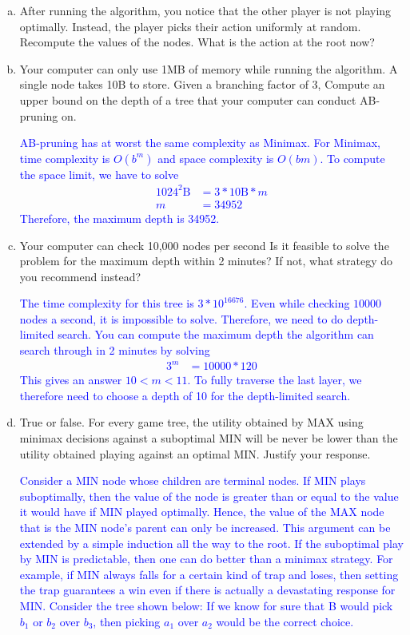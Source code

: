 \documentclass[a4paper]{article}
\begin{document}
\begin{enumerate}[(a)]
\item After running the algorithm, you notice that the other player is not playing optimally. Instead, the player picks their action uniformly at random. Recompute the values of the nodes. What is the action at the root now? 

\item Your computer can only use 1MB of memory while running the algorithm. A single node takes 10B to store. Given a branching factor of 3, Compute an upper bound on the depth of a tree that your computer can conduct AB-pruning on.

\textcolor{blue}{AB-pruning has at worst the same complexity as Minimax. For Minimax, time complexity is $O(b^m)$ and space complexity is $O(bm)$. To compute the space limit, we have to solve 
\begin{align*}
1024^2\text{B} &=3*10\text{B}*m \\
m &= 34952
\end{align*}
Therefore, the maximum depth is 34952. 
}

\item Your computer can check 10,000 nodes per second Is it feasible to solve the problem for the maximum depth within 2 minutes? If not, what strategy do you recommend instead?

\textcolor{blue}{The time complexity for this tree is $3 * 10^{16676}$. Even while checking $10000$ nodes a second, it is impossible to solve. Therefore, we need to do depth-limited search. You can compute the maximum depth the algorithm can search through in 2 minutes by solving
\begin{align*}
3^m &= 10000 * 120
\end{align*}
This gives an answer $10 < m < 11$. To fully traverse the last layer, we therefore need to choose a depth of 10 for the depth-limited search. 
}

\item True or false. For every game tree, the utility obtained by MAX using minimax decisions against a suboptimal MIN will be never be lower than the utility obtained playing against an optimal MIN. Justify your response. 

\textcolor{blue}{Consider a MIN node whose children are terminal nodes. If MIN plays suboptimally, then the value of the node is greater than or equal to the value it would have if MIN played optimally. Hence, the value of the MAX node that is the MIN node’s parent can only be increased. This argument can be extended by a simple induction all the way to the root. If the suboptimal play by MIN is predictable, then one can do better than a minimax strategy. For example, if MIN always falls for a certain kind of trap and loses, then setting the trap guarantees a win even if there is actually a devastating response for MIN. Consider the tree shown below: If we know for sure that B would pick $b_1$ or $b_2$ over $b_3$, then picking $a_1$ over $a_2$ would be the correct choice.}



\end{enumerate}
\end{document}
